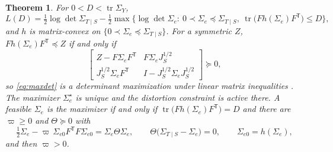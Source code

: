 \documentclass[11pt,onecolumn]{IEEEtran}
\newtheorem{theorem}{Theorem}
\newcommand{\tr}{\operatorname{tr}}
\begin{document}
\begin{theorem}\label{thm:maxdet}
For $0<D<\tr\Sigma_Y$,
\begin{equation}
L(D)=\tfrac12\log\det\Sigma_{T\mid S}
-\tfrac12\max\bigl\{\log\det\Sigma_e:\
0\prec\Sigma_e\preceq\Sigma_{T\mid S},\
\tr\bigl(Fh(\Sigma_e)F^{\mathsf T}\bigr)\le D\bigr\},
\label{eq:maxdet}
\end{equation}
and $h$ is matrix-convex on $\{0\prec\Sigma_e\preceq\Sigma_{T\mid S}\}$.
For a symmetric $Z$, $Fh(\Sigma_e)F^{\mathsf T}\preceq Z$ if and only if
\begin{equation}
\begin{bmatrix}
Z-F\Sigma_eF^{\mathsf T}&F\Sigma_eJ_S^{1/2}\\
J_S^{1/2}\Sigma_eF^{\mathsf T}&I-J_S^{1/2}\Sigma_eJ_S^{1/2}
\end{bmatrix}\succeq0,
\label{eq:lmi}
\end{equation}
so \eqref{eq:maxdet} is a determinant maximization under linear matrix
inequalities \cite{vandenberghe1998}. The maximizer $\Sigma_e^\star$ is
unique and the distortion constraint is active there. A feasible
$\Sigma_e$ is the maximizer if and only if
$\tr\bigl(Fh(\Sigma_e)F^{\mathsf T}\bigr)=D$ and there are $\varpi\ge0$ and
$\Theta\succeq0$ with
\begin{equation}
\tfrac12\Sigma_e-\varpi\,\Sigma_{e0}F^{\mathsf T}F\Sigma_{e0}
=\Sigma_e\Theta\Sigma_e,
\qquad
\Theta\bigl(\Sigma_{T\mid S}-\Sigma_e\bigr)=0,
\qquad\Sigma_{e0}=h(\Sigma_e),
\label{eq:kktcoupled}
\end{equation}
and then $\varpi>0$.
\end{theorem}
\end{document}
